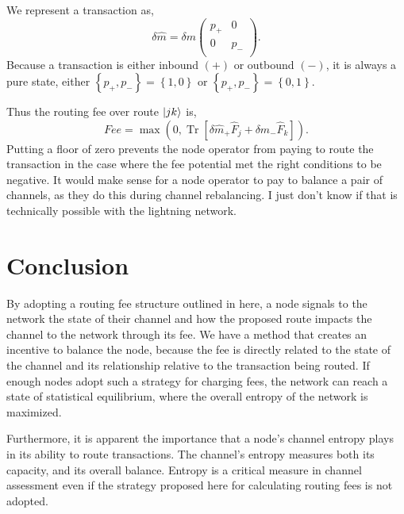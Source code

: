 \documentclass[review,12pt]{elsarticle}
\DeclareMathOperator{\Tr}{\mathrm{Tr}}
\begin{document}
We represent a transaction as,
\begin{equation}
  \delta \hat{m} = \delta m \begin{pmatrix}
    p_+ & 0   \\
    0   & p_- \\
  \end{pmatrix}. \nonumber
\end{equation}
Because a transaction is either inbound $(+)$ or outbound $(-)$, it is always a pure state, either $\left\{p_+, p_-\right\} = \left\{1, 0\right\}$ or $\left\{p_+, p_-\right\} = \left\{0, 1\right\}$.

Thus the routing fee over route $\Ket{jk}$ is,
\begin{equation}
  Fee = \max\left(0,\Tr\left[ \delta \hat{m}_+ \hat{F}_j + \delta \hat{m}_- \hat{F}_k \right]\right). \label{eq:3}
\end{equation}
Putting a floor of zero prevents the node operator from paying to route the transaction in the case where the fee potential met the right conditions to be negative.
It would make sense for a node operator to pay to balance a pair of channels, as they do this during channel rebalancing.
I just don't know if that is technically possible with the lightning network.

\section{Conclusion}
By adopting a routing fee structure outlined in here, a node signals to the network the state of their channel and how the proposed route impacts the channel to the network through its fee.
We have a method that creates an incentive to balance the node, because the fee is directly related to the state of the channel and its relationship relative to the transaction being routed.
If enough nodes adopt such a strategy for charging fees, the network can reach a state of statistical equilibrium, where the overall entropy of the network is maximized.

Furthermore, it is apparent the importance that a node's channel entropy plays in its ability to route transactions.
The channel's entropy measures both its capacity, and its overall balance.
Entropy is a critical measure in channel assessment even if the strategy proposed here for calculating routing fees is not adopted.




\end{document}
